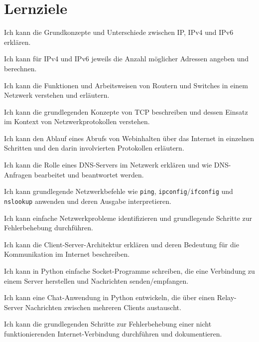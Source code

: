 \chapter{Lernziele}

\begin{todolist}
    \item Ich kann die Grundkonzepte und Unterschiede zwischen IP, IPv4 und IPv6 erklären.
    \item Ich kann für IPv4 und IPv6 jeweils die Anzahl möglicher Adressen angeben und berechnen.
    \item Ich kann die Funktionen und Arbeitsweisen von Routern und Switches in einem Netzwerk verstehen und erläutern.
    \item Ich kann die grundlegenden Konzepte von TCP beschreiben und dessen Einsatz im Kontext von Netzwerkprotokollen verstehen.
    \item Ich kann den Ablauf eines Abrufs von Webinhalten über das Internet in einzelnen Schritten und den darin involvierten Protokollen erläutern.
    \item Ich kann die Rolle eines DNS-Servers im Netzwerk erklären und wie DNS-Anfragen bearbeitet und beantwortet werden.
    \item Ich kann grundlegende Netzwerkbefehle wie \texttt{ping}, \texttt{ipconfig}/\texttt{ifconfig} und \texttt{nslookup} anwenden und deren Ausgabe interpretieren.
    \item Ich kann einfache Netzwerkprobleme identifizieren und grundlegende Schritte zur Fehlerbehebung durchführen.
    \item Ich kann die Client-Server-Architektur erklären und deren Bedeutung für die Kommunikation im Internet beschreiben.
    \item Ich kann in Python einfache Socket-Programme schreiben, die eine Verbindung zu einem Server herstellen und Nachrichten senden/empfangen.
    \item Ich kann eine Chat-Anwendung in Python entwickeln, die über einen Relay-Server Nachrichten zwischen mehreren Clients austauscht.
    \item Ich kann die grundlegenden Schritte zur Fehlerbehebung einer nicht funktionierenden Internet-Verbindung durchführen und dokumentieren.
\end{todolist}
